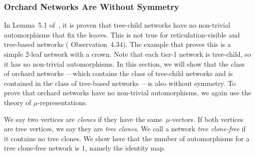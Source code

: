 \documentclass{article}
\theoremstyle{definition}
\begin{document}
\subsubsection{Orchard Networks Are Without Symmetry}
In Lemma~5.1 of~\cite{mcdiarmid2015counting}, it is proven that tree-child networks have no non-trivial automorphisms that fix the leaves. This is not true for reticulation-visible and tree-based networks (\cite{klawitter2020spaces} Observation~4.34). The example that proves this is a simple 2-leaf network with a crown. Note that each tier-1 network is tree-child, so it has no non-trivial automorphisms. In this section, we will show that the class of orchard networks \cite{janssen2021cherry,erdHos2019class}---which contains the class of tree-child networks \cite{janssen2021cherry} and is contained in the class of tree-based networks \cite{van2022orchard}---is also without symmetry. To prove that orchard networks have no non-trivial automorphisms, we again use the theory of $\mu$-representations.

We say two vertices are \emph{clones} if they have the same~$\mu$-vectors.
If both vertices are tree vertices, we say they are \emph{tree clones}.
We call a network \emph{tree clone-free} if it contains no tree clones.
We show here that the number of automorphisms for a tree clone-free network is 1, namely the identity map.
\end{document}
